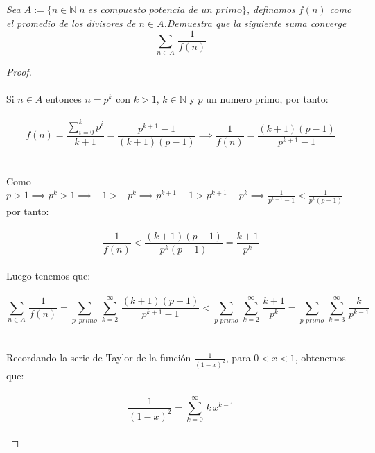 \documentclass[11pt,letterpaper]{article}
\newcommand{\N}{\mathbb{N}}
\begin{document}
\begin{tcolorbox}[
	title = \textcolor{black}{\textcolor{white}{Problema 2}},]
\textit{Sea $A:=\{n\in \N| n\,\,es \,\,compuesto\,\,potencia\,\,de \,\,un\,\,primo\}$, definamos $f(n)$ como el promedio de los divisores de $n\in A$.Demuestra que la siguiente suma converge\,\\
\begin{equation*}
    \sum_{n\in A}\,\frac{1}{f(n)}
\end{equation*}
}
\end{tcolorbox}
\begin{proof}\,\\
    \,\\
    Si $n\in A$ entonces $n=p^k$ con $k>1$, $k\in \N$ y $p$ un numero primo, por tanto:\,\\
    \,\\
    \begin{equation*}
        f(n)=\frac{\sum_{i=0}^k p^i}{k+1}=\frac{p^{k+1}-1}{(k+1)(p-1)}\implies \frac{1}{f(n)}=\frac{(k+1)(p-1)}{p^{k+1}-1}
    \end{equation*}\,\\
    \,\\
    Como $p>1\implies p^k>1\implies -1>-p^k\implies p^{k+1}-1>p^{k+1}-p^k\implies \frac{1}{p^{k+1}-1}<\frac{1}{p^k(p-1)}$ por tanto:\,\\
    \,\\
    \begin{equation*}
        \frac{1}{f(n)}<\frac{(k+1)(p-1)}{p^k(p-1)}=\frac{k+1}{p^k}
    \end{equation*}\,\\
    Luego tenemos que:\,\\
    \,\\
    \begin{equation*}
       \sum_{n\in A}\,\frac{1}{f(n)}= \sum_{p\,\,\,primo}\,\sum_{k=2}^{\infty}\,\frac{(k+1)(p-1)}{p^{k+1}-1}<\sum_{p\,\,primo}\,\sum_{k=2}^{\infty}\,\frac{k+1}{p^k}=\sum_{p\,\,primo}\,\sum_{k=3}^{\infty}\,\frac{k}{p^{k-1}}
    \end{equation*}\,\\
    \,\\
    Recordando la serie de Taylor de la funci\'on $\frac{1}{(1-x)^2}$, para $0<x<1$, obtenemos que:\,\\
    \,\\
    \begin{equation*}
        \frac{1}{(1-x)^2}=\sum_{k=0}^{\infty}\,k\,x^{k-1}
    \end{equation*}\,\\

\end{proof}
\end{document}
